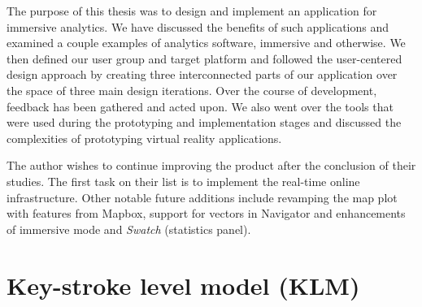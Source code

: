 \documentclass[thesis=M,english,hidelinks]{FITthesisXE}[2012/06/26]
\begin{document}
\begin{conclusion}

The purpose of this thesis was to design and implement an application for immersive analytics. We have discussed the benefits of such applications and examined a couple examples of analytics software, immersive and otherwise. We then defined our user group and target platform and followed the user-centered design approach by creating three interconnected parts of our application over the space of three main design iterations. Over the course of development, feedback has been gathered and acted upon. We also went over the tools that were used during the prototyping and implementation stages and discussed the complexities of prototyping virtual reality applications.

The author wishes to continue improving the product after the conclusion of their studies. The first task on their list is to implement the real-time online infrastructure. Other notable future additions include revamping the map plot with features from Mapbox\autocite{mapbox}, support for vectors in Navigator and enhancements of immersive mode and \emph{Swatch} (statistics panel).

\end{conclusion}

\printbibliography[title={Sources}]

\appendix

\chapter{Key-stroke level model (KLM)}

\begin{table}[!h]
\centering
\caption{Excerpt of used operators.\autocite{klm}}
\label{klm}
\end{table}
\end{document}
